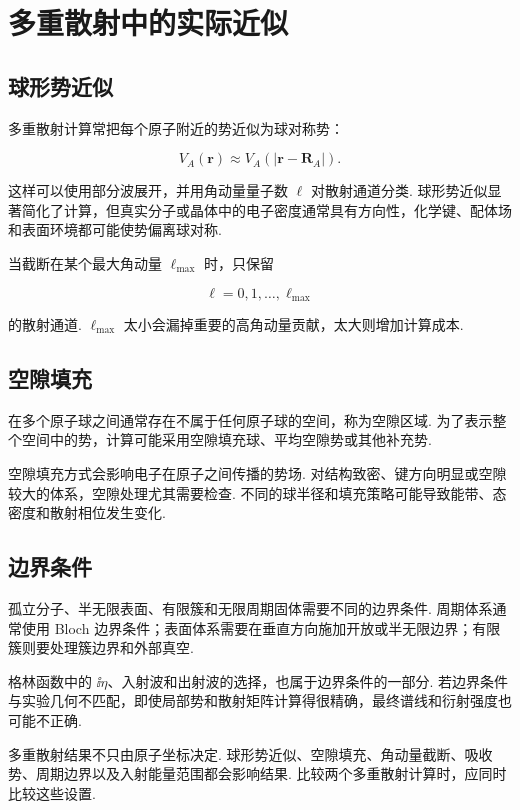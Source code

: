 \documentclass[UTF8,11pt,a4paper,openany]{ctexbook}
\begin{document}
\section{多重散射中的实际近似}

\subsection{球形势近似}

多重散射计算常把每个原子附近的势近似为球对称势：

\[
V_A(\mathbf r)
\approx
V_A(|\mathbf r-\mathbf R_A|).
\]

这样可以使用部分波展开，并用角动量量子数 $\ell$ 对散射通道分类. 球形势近似显著简化了计算，但真实分子或晶体中的电子密度通常具有方向性，化学键、配体场和表面环境都可能使势偏离球对称. 

当截断在某个最大角动量 $\ell_{\max}$ 时，只保留

\[
\ell=0,1,\ldots,\ell_{\max}
\]

的散射通道. $\ell_{\max}$ 太小会漏掉重要的高角动量贡献，太大则增加计算成本. 

\subsection{空隙填充}

在多个原子球之间通常存在不属于任何原子球的空间，称为空隙区域. 为了表示整个空间中的势，计算可能采用空隙填充球、平均空隙势或其他补充势. 

空隙填充方式会影响电子在原子之间传播的势场. 对结构致密、键方向明显或空隙较大的体系，空隙处理尤其需要检查. 不同的球半径和填充策略可能导致能带、态密度和散射相位发生变化. 

\subsection{边界条件}

孤立分子、半无限表面、有限簇和无限周期固体需要不同的边界条件. 周期体系通常使用 Bloch 边界条件；表面体系需要在垂直方向施加开放或半无限边界；有限簇则要处理簇边界和外部真空. 

格林函数中的 $\ii\eta$、入射波和出射波的选择，也属于边界条件的一部分. 若边界条件与实验几何不匹配，即使局部势和散射矩阵计算得很精确，最终谱线和衍射强度也可能不正确. 

\begin{limitbox}
多重散射结果不只由原子坐标决定. 球形势近似、空隙填充、角动量截断、吸收势、周期边界以及入射能量范围都会影响结果. 比较两个多重散射计算时，应同时比较这些设置. 
\end{limitbox}
\end{document}
